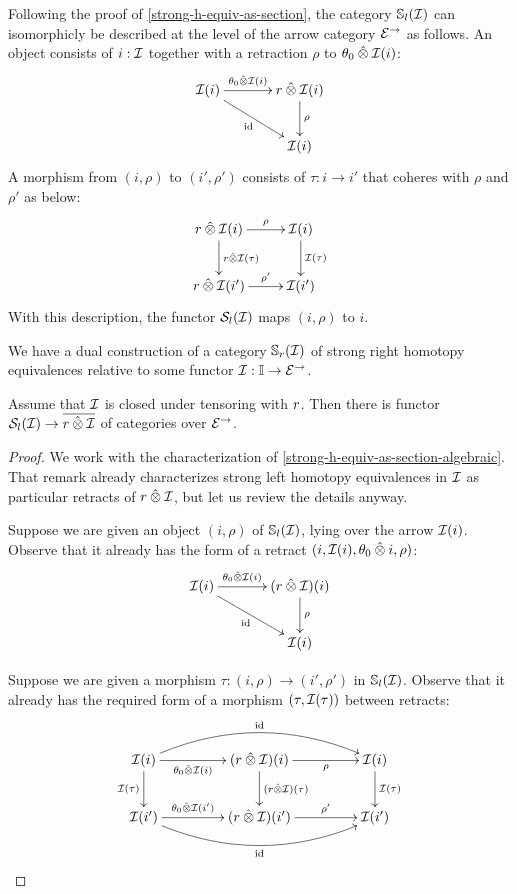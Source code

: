 \documentclass[reqno,10pt,a4paper,oneside]{amsart}
\begin{document}
\begin{remark}
\label{strong-h-equiv-as-section-algebraic}
Following the proof of \cref{strong-h-equiv-as-section}, the category $\cat{S}_l(\cal{I})$ can isomorphicly be described at the level of the arrow category $\catE^{\to}$ as follows.
An object consists of $i : \cal{I}$ together with a retraction $\rho$ to $\thetal \hatotimes \cal{I}(i)$:
\[
\xymatrix@C+1em{
  \cal{I}(i)
  \ar[r]^-{\thetal \hatotimes \cal{I}(i)}
  \ar[dr]_{\id}
&
  \intervalr \hatotimes \cal{I}(i) \ar[d]^{\rho}
\\&
  \cal{I}(i)
}
\]
A morphism from $(i, \rho)$ to $(i', \rho')$ consists of $\tau : i \to i'$ that coheres with $\rho$ and $\rho'$ as below:
\[
\xymatrix{
  \intervalr \hatotimes \cal{I}(i)
  \ar[r]^-{\rho}
  \ar[d]^{\intervalr \hatotimes \cal{I}(\tau)}
&
  \cal{I}(i)
  \ar[d]^{\cal{I}(\tau)}
\\
  \intervalr \hatotimes \cal{I}(i')
  \ar[r]^-{\rho'}
&
  \cal{I}(i')
}
\]
With this description, the functor $\cal{S}_l(\cal{I})$ maps $(i, \rho)$ to $i$.
\end{remark}

\begin{remark}
We have a dual construction of a category $\cat{S}_r(\cal{I})$ of strong right homotopy equivalences relative to some functor $\cal{I} : \cat{I} \to \catE^{\to}$.
\end{remark}

\begin{lemma}
\label{she-to-retract-closure}
Assume that $\cal{I}$ is closed under tensoring with $\intervalr$.
Then there is functor $\cal{S}_l(\cal{I}) \to \overline{\intervalr \hatotimes \cal{I}}$ of categories over $\catE^{\to}$.
\end{lemma}

\begin{proof}
We work with the characterization of \cref{strong-h-equiv-as-section-algebraic}.
That remark already characterizes strong left homotopy equivalences in $\cal{I}$ as particular retracts of $\intervalr \hatotimes \cal{I}$, but let us review the details anyway.

Suppose we are given an object $(i, \rho)$ of $\cat{S}_l(\cal{I})$, lying over the arrow $\cal{I}(i)$.
Observe that it already has the form of a retract $(i, \cal{I}(i), \thetal \hatotimes i, \rho)$:
\[
\xymatrix@C+1em{
  \cal{I}(i)
  \ar[r]^-{\thetal \hatotimes \cal{I}(i)}
  \ar[dr]_{\id}
&
  (\intervalr \hatotimes \cal{I})(i) \ar[d]^{\rho}
\\&
  \cal{I}(i)
}
\]

Suppose we are given a morphism $\tau : (i, \rho) \to (i', \rho')$ in $\cat{S}_l(\cal{I})$.
Observe that it already has the required form of a morphism $(\tau, \cal{I}(\tau))$ between retracts:
\[
\xymatrix@C+2em{
  \cal{I}(i)
  \ar[r]_-{\thetal \hatotimes \cal{I}(i)}
  \ar[d]_{\cal{I}(\tau)}
  \ar@/^2em/[rr]^{\id}
&
  (\intervalr \hatotimes \cal{I})(i)
  \ar[r]_-{\rho}
  \ar[d]^{(\intervalr \hatotimes \cal{I})(\tau)}
&
  \cal{I}(i)
  \ar[d]^{\cal{I}(\tau)}
\\
  \cal{I}(i')
  \ar[r]^-{\thetal \hatotimes \cal{I}(i')}
  \ar@/_2em/[rr]_{\id}
&
  (\intervalr \hatotimes \cal{I})(i')
  \ar[r]^-{\rho'}
&
  \cal{I}(i')
}
\]
\end{proof}
\end{document}
